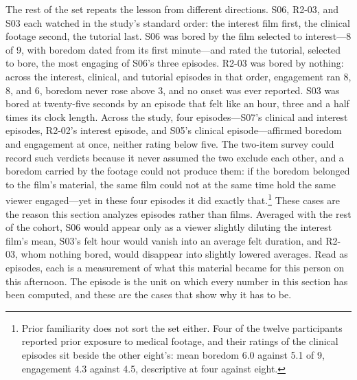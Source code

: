 The rest of the set repeats the lesson from different directions. S06, R2-03, and S03 each
watched in the study's standard order: the interest film first, the clinical footage second,
the tutorial last. S06 was bored by the film selected to interest---8 of 9, with boredom
dated from its first minute---and rated the tutorial, selected to bore, the most engaging of
S06's three episodes. R2-03 was bored by nothing: across the interest, clinical, and tutorial
episodes in that order, engagement ran 8, 8, and 6, boredom never rose above 3, and no onset
was ever reported. S03 was bored at twenty-five seconds by an episode that felt like an hour,
three and a half times its clock length. Across the study, four episodes---S07's clinical and
interest episodes, R2-02's interest episode, and S05's clinical episode---affirmed boredom and
engagement at once, neither rating below five. The two-item survey could record such verdicts
because it never assumed the two exclude each other, and a boredom carried by the footage
could not produce them: if the boredom belonged to the film's material, the same film could
not at the same time hold the same viewer engaged---yet in these four episodes it did exactly
that.\footnote{Prior familiarity does not sort the set either.
Four of the twelve participants reported prior exposure to medical footage, and their ratings
of the clinical episodes sit beside the other eight's: mean boredom 6.0 against 5.1 of 9,
engagement 4.3 against 4.5, descriptive at four against eight.} These cases are the reason
this section analyzes episodes rather than films. Averaged with the rest of the cohort, S06
would appear only as a viewer slightly diluting the interest film's mean, S03's felt hour
would vanish into an average felt duration, and R2-03, whom nothing bored, would disappear
into slightly lowered averages. Read as episodes, each is a measurement of what this material
became for this person on this afternoon. The episode is the unit on which every number in
this section has been computed, and these are the cases that show why it has to be.

